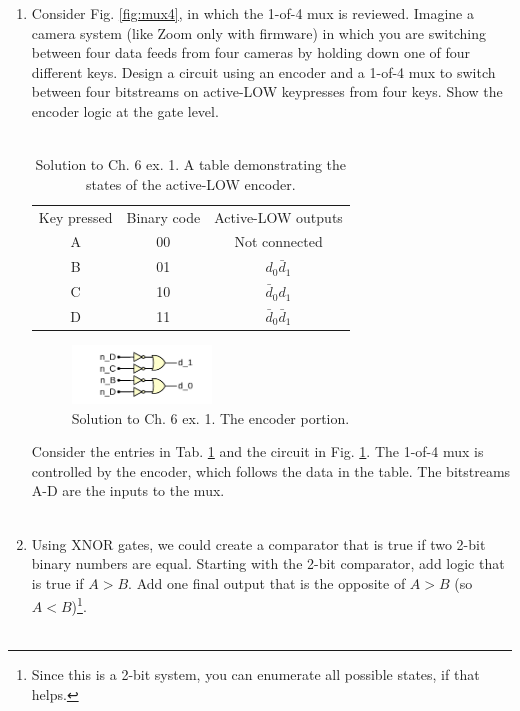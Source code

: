 \documentclass[10pt]{article}
\begin{document}
\begin{enumerate}
\item Consider Fig. \ref{fig:mux4}, in which the 1-of-4 mux is reviewed.  Imagine a camera system (like Zoom only with firmware) in which you are switching between four data feeds from four cameras by holding down one of four different keys.  Design a circuit using an encoder and a 1-of-4 mux to switch between four bitstreams on active-LOW keypresses from four keys. Show the encoder logic at the gate level. \\ \\
\begin{table}[hb]
\centering
\begin{tabular}{| c | c | c |}
\hline
\hline
Key pressed & Binary code & Active-LOW outputs \\
A & 00 & Not connected \\
B & 01 & $d_0 \bar{d}_1$ \\
C & 10 & $\bar{d}_0 d_1$ \\
D & 11 & $\bar{d}_0 \bar{d}_1$ \\
\hline
\hline
\end{tabular}
\caption{\label{tab:mux} Solution to Ch. 6 ex. 1.  A table demonstrating the states of the active-LOW encoder.}
\end{table}
\begin{figure}
\centering
\includegraphics[width=0.35\textwidth]{figures/gateExample10.pdf}
\caption{\label{fig:muxDecode} Solution to Ch. 6 ex. 1.  The encoder portion.}
\end{figure}
Consider the entries in Tab. \ref{tab:mux} and the circuit in Fig. \ref{fig:muxDecode}.  The 1-of-4 mux is controlled by the encoder, which follows the data in the table.  The bitstreams A-D are the inputs to the mux. \\ \\
\item Using XNOR gates, we could create a comparator that is true if two 2-bit binary numbers are equal.  Starting with the 2-bit comparator, add logic that is true if $A>B$.  Add one final output that is the opposite of $A>B$ (so $A<B$)\footnote{Since this is a 2-bit system, you can enumerate all possible states, if that helps.}. \\ \\ 

\end{enumerate}
\end{document}
